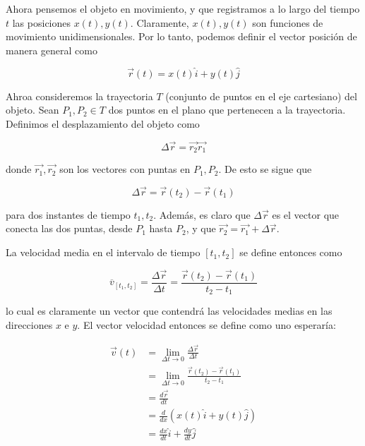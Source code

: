 \documentclass[12pt]{article}
\theoremstyle{definition}
\begin{document}
Ahora pensemos el objeto en movimiento, y que registramos a lo largo del tiempo
$t$ las posiciones $x(t), y(t)$. Claramente, $x(t), y(t)$ son funciones de
movimiento unidimensionales. Por lo tanto, podemos definir el vector posición de
manera general como 

\begin{equation}
    \vec{r}(t) = x(t)\hat{i} + y(t) \hat{j}
\end{equation}

Ahroa consideremos la trayectoria $T$ (conjunto de puntos en el eje cartesiano)
del objeto. Sean $P_1, P_2 \in T$ dos puntos en el plano que pertenecen a la
trayectoria. Definimos el desplazamiento del objeto como 

\begin{equation}
    \Delta \vec{r} = \vec{r_2} \vec{r_1}
\end{equation}

donde $\vec{r_1}, \vec{r_2}$ son los vectores con puntas en $P_1, P_2$. De esto
se sigue que 


\begin{equation}
    \Delta \vec{r} = \vec{r}(t_2) - \vec{r}(t_1)
\end{equation}


para dos instantes de tiempo $t_1, t_2$. Además, es claro que $\Delta\vec{r}$ es
el vector que conecta las dos puntas, desde $P_1$ hasta $P_2$, y que $\vec{r_2}
= \vec{r_1} + \Delta \vec{r}$. 

La velocidad media en el intervalo de tiempo $[t_1, t_2]$ se define entonces
como 

\begin{equation}
    \overline{v}_{[t_1, t_2]} = \frac{\Delta \vec{r}}{\Delta t} = 
    \frac{\vec{r}(t_2)-  \vec{r}(t_1)}{t_2 - t_1}
\end{equation}

lo cual es claramente un vector que contendrá las velocidades medias en las
direcciones $x$ e $y$. El vector velocidad entonces se define como uno
esperaría: 

\begin{align}
    \vec{v}(t) 
    &= \lim_{\Delta t \to 0}  \frac{\Delta \vec{r}}{\Delta t}  \\
    &= \lim_{\Delta t \to 0} \frac{\vec{r}(t_2)-  \vec{r}(t_1)}{t_2 - t_1}
    \nonumber \\
    &= \frac{d \vec{r}}{dt} \nonumber \\ 
    &= \frac{d}{dx} \left( x(t)\hat{i} + y(t) \hat{j} \right) \nonumber\\ 
    &= \frac{dx}{dt} \hat{i} + \frac{dy}{dt} \hat{j} \nonumber
\end{align}
\end{document}
